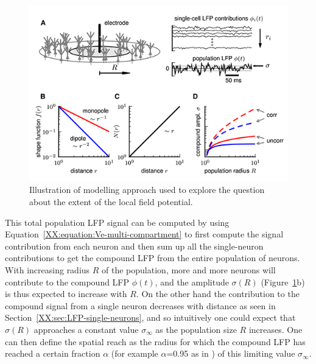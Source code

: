\begin{figure}
\begin{center}
\includegraphics{Figures/LFP/LFP-how-local-is-the-LFP-w90-r150}
\end{center}
\caption[]{Illustration of modelling approach used to explore the question
about the extent of the local field potential.
}
\label{LFP:fig:how-local}
\end{figure}
  
This total population LFP signal can be computed by using 
Equation~\ref{XX:equation:Ve-multi-compartment} to first compute the signal contribution from each neuron and 
then sum up all the single-neuron contributions to get the compound LFP from the entire population of neurons.
With increasing radius $R$ of the population, more and more neurons will contribute to the compound LFP $\phi(t)$,
and the amplitude $\sigma(R)$ (Figure~\ref{LFP:fig:how-local}b) is thus expected to increase with
$R$. On the other hand the contribution to the compound signal from a single neuron decreases with distance 
as seen in Section~\ref{XX:sec:LFP-single-neurons}, and so intuitively one could expect that $\sigma(R)$ approaches
a constant value $\sigma_\infty$ as the population size $R$ increases. One can then define the spatial reach as the radius for which
the compound LFP has reached a certain fraction $\alpha$ (for example $\alpha$=0.95 as in ) of this limiting value $\sigma_\infty$. 

